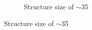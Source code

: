 \begin{figure}[ht]
\centering
    \begin{subfigure}[t]{0.24\linewidth}
	\centering
	\caption{Structure size of $\sim$35}
	\label{fig:b2d5_q5}
\end{subfigure}
\hfill

\end{figure}
